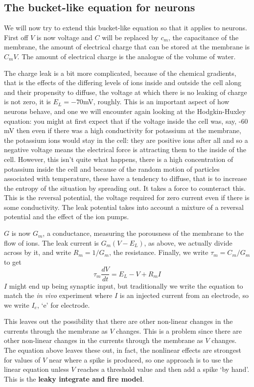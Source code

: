 \documentclass[11pt,a4paper]{scrartcl}
\begin{document}
\subsection*{The bucket-like equation for neurons}

We will now try to extend this bucket-like equation so that it applies
to neurons. First off $V$ is now voltage and $C$ will be replaced by
$c_m$, the capacitance of the membrane, the amount of electrical
charge that can be stored at the membrane is $C_mV$. The amount of
electrical charge is the analogue of the volume of water. 

The charge leak is a bit more complicated, because of the chemical
gradients, that is the effects of the differing levels of ions inside
and outside the cell along and their propensity to diffuse, the
voltage at which there is no leaking of charge is not zero, it is
$E_L=-70 $mV, roughly. This is an important aspect of how neurons
behave, and one we will encounter again looking at the Hodgkin-Huxley
equation: you might at first expect that if the voltage inside the
cell was, say, -60 mV then even if there was a high conductivity for
potassium at the membrane, the potassium ions would stay in the cell:
they are positive ions after all and so a negative voltage means the
electrical force is attracting them to the inside of the
cell. However, this isn't quite what happens, there is a high
concentration of potassium inside the cell and because of the random
motion of particles associated with temperature, these have a tendency
to diffuse, that is to increase the entropy of the situation by
spreading out. It takes a force to counteract this. This is the
reversal potential, the voltage required for zero current even if
there is some conductivity. The leak potential takes into account a
mixture of a reversal potential and the effect of the ion pumps.

$G$ is now $G_m$, a conductance, measuring the porousness of the
membrane to the flow of ions. The leak current is $G_m(V-E_L)$, as
above, we actually divide across by it, and write $R_m=1/G_m$, the
resistance. Finally, we write $\tau_m=C_m/G_m$ to get
\begin{equation}
\tau_m\frac{dV}{dt}=E_L-V+R_mI
\end{equation}
$I$ might end up being synaptic input, but traditionally we write the
equation to match the \textsl{in vivo} experiment where $I$ is an
injected current from an electrode, so we write $I_e$, \lq{}e\rq{} for
electrode.

This leaves out the possibility that there are other non-linear
changes in the currents through the membrane as $V$ changes. This is a
problem since there are other non-linear changes in the currents
through the membrane as $V$ changes. The equation above leaves these
out, in fact, the nonlinear effects are strongest for values of $V$
near where a spike is produced, so one approach is to use the linear
equation unless $V$ reaches a threshold value and then add a spike \lq{}by
hand\rq{}. This is the \textbf{leaky integrate and fire model}.
\end{document}
